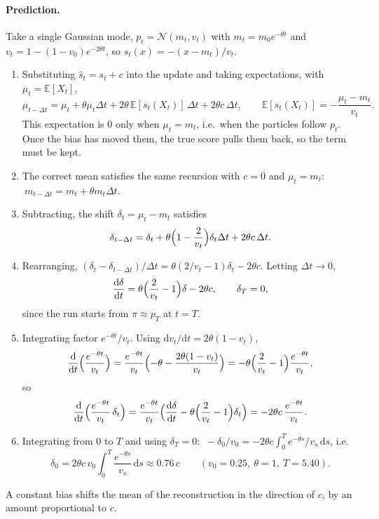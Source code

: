 \documentclass[11pt]{article}
\newcommand{\E}{\mathbb{E}}
\newcommand{\N}{\mathcal{N}}
\newcommand{\dd}{\mathrm{d}}
\begin{document}
\paragraph{Prediction.} Take a single Gaussian mode, $p_t = \N(m_t,v_t)$ with $m_t = m_0e^{-\theta t}$ and $v_t = 1-(1-v_0)e^{-2\theta t}$, so
$s_t(x) = -(x-m_t)/v_t$.
\begin{enumerate}
\item Substituting $\hat s_t = s_t + c$ into the update and taking expectations, with $\mu_t = \E[X_t]$,
\[
\mu_{t-\Delta t} = \mu_t + \theta\mu_t\Delta t + 2\theta\,\E[s_t(X_t)]\,\Delta t + 2\theta c\,\Delta t,
\qquad \E[s_t(X_t)] = -\frac{\mu_t - m_t}{v_t}.
\]
This expectation is $0$ only when $\mu_t = m_t$, i.e.\ when the particles follow $p_t$. Once the bias has moved them, the true score
pulls them back, so the term must be kept.
\item The correct mean satisfies the same recursion with $c=0$ and $\mu_t = m_t$: $\ m_{t-\Delta t} = m_t + \theta m_t\Delta t$.
\item Subtracting, the shift $\delta_t = \mu_t - m_t$ satisfies
\[
\delta_{t-\Delta t} = \delta_t + \theta\Bigl(1-\frac2{v_t}\Bigr)\delta_t\Delta t + 2\theta c\,\Delta t .
\]
\item Rearranging, $(\delta_t - \delta_{t-\Delta t})/\Delta t = \theta(2/v_t - 1)\delta_t - 2\theta c$. Letting $\Delta t\to0$,
\[
\frac{\dd\delta}{\dd t} = \theta\Bigl(\frac2{v_t}-1\Bigr)\delta - 2\theta c, \qquad \delta_T = 0 ,
\]
since the run starts from $\pi\approx p_T$ at $t=T$.
\item Integrating factor $e^{-\theta t}/v_t$. Using $\dd v_t/\dd t = 2\theta(1-v_t)$,
\[
\frac{\dd}{\dd t}\Bigl(\frac{e^{-\theta t}}{v_t}\Bigr) = \frac{e^{-\theta t}}{v_t}\Bigl(-\theta - \frac{2\theta(1-v_t)}{v_t}\Bigr)
= -\theta\Bigl(\frac2{v_t}-1\Bigr)\frac{e^{-\theta t}}{v_t},
\]
so
\[
\frac{\dd}{\dd t}\Bigl(\frac{e^{-\theta t}}{v_t}\,\delta_t\Bigr) = \frac{e^{-\theta t}}{v_t}\Bigl(\frac{\dd\delta}{\dd t} - \theta\Bigl(\frac2{v_t}-1\Bigr)\delta_t\Bigr)
= -2\theta c\,\frac{e^{-\theta t}}{v_t} .
\]
\item Integrating from $0$ to $T$ and using $\delta_T = 0$: $\ -\delta_0/v_0 = -2\theta c\int_0^T e^{-\theta s}/v_s\,\dd s$, i.e.
\[
\boxed{\delta_0 = 2\theta c\,v_0\int_0^T \frac{e^{-\theta s}}{v_s}\,\dd s \approx 0.76\,c}
\qquad (v_0 = 0.25,\ \theta=1,\ T=5.40).
\]
\end{enumerate}
A constant bias shifts the mean of the reconstruction in the direction of $c$, by an amount proportional to $c$.
\end{document}
